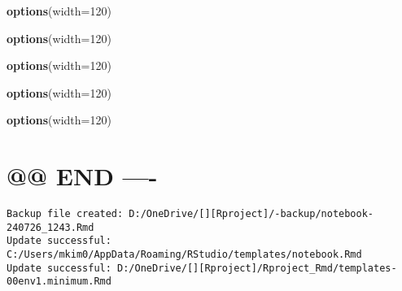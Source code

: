\documentclass[
]{article}
\newenvironment{Shaded}{\begin{snugshade}}{\end{snugshade}}
\newcommand{\AttributeTok}[1]{\textcolor[rgb]{0.13,0.29,0.53}{#1}}
\newcommand{\DecValTok}[1]{\textcolor[rgb]{0.00,0.00,0.81}{#1}}
\newcommand{\FunctionTok}[1]{\textcolor[rgb]{0.13,0.29,0.53}{\textbf{#1}}}
\newcommand{\NormalTok}[1]{#1}
\begin{document}
\begin{Shaded}
\begin{Highlighting}[]
\FunctionTok{options}\NormalTok{(}\AttributeTok{width=}\DecValTok{120}\NormalTok{)}
\end{Highlighting}
\end{Shaded}

\begin{Shaded}
\begin{Highlighting}[]
\FunctionTok{options}\NormalTok{(}\AttributeTok{width=}\DecValTok{120}\NormalTok{)}
\end{Highlighting}
\end{Shaded}

\begin{Shaded}
\begin{Highlighting}[]
\FunctionTok{options}\NormalTok{(}\AttributeTok{width=}\DecValTok{120}\NormalTok{)}
\end{Highlighting}
\end{Shaded}

\begin{Shaded}
\begin{Highlighting}[]
\FunctionTok{options}\NormalTok{(}\AttributeTok{width=}\DecValTok{120}\NormalTok{)}
\end{Highlighting}
\end{Shaded}

\begin{Shaded}
\begin{Highlighting}[]
\FunctionTok{options}\NormalTok{(}\AttributeTok{width=}\DecValTok{120}\NormalTok{)}
\end{Highlighting}
\end{Shaded}

\hypertarget{end--}{%
\section{@@ END ----}\label{end--}}

\begin{verbatim}
Backup file created: D:/OneDrive/[][Rproject]/-backup/notebook-240726_1243.Rmd
Update successful: C:/Users/mkim0/AppData/Roaming/RStudio/templates/notebook.Rmd
Update successful: D:/OneDrive/[][Rproject]/Rproject_Rmd/templates-00env1.minimum.Rmd
\end{verbatim}
\end{document}
